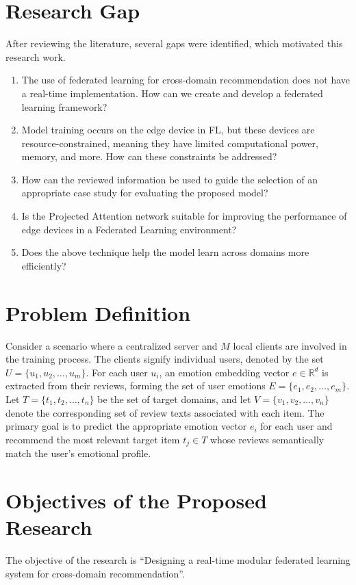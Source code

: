 \section{Research Gap}
After reviewing the literature, several gaps were identified, which motivated this research work.

\begin{enumerate}
\item The use of federated learning for cross-domain recommendation does not have a real-time implementation. How can we create and develop a federated learning framework?

\item Model training occurs on the edge device in FL, but these devices are resource-constrained, meaning they have limited computational power, memory, and more. How can these constraints be addressed?

\item How can the reviewed information be used to guide the selection of an appropriate case study for evaluating the proposed model?

\item Is the Projected Attention network suitable for improving the performance of edge devices in a Federated Learning environment?

\item Does the above technique help the model learn across domains more efficiently?
\end{enumerate}

\section{Problem Definition}
Consider a scenario where a centralized server and $M$ local clients are involved in the training process. The clients signify individual users, denoted by the set $U = \{u_1, u_2, \ldots, u_m\}$. For each user $u_i$, an emotion embedding vector $e \in \mathbb{R}^{d}$ is extracted from their reviews, forming the set of user emotions $E = \{e_1, e_2, \ldots, e_m\}$. Let $T = \{t_1, t_2, \ldots, t_n\}$ be the set of target domains, and let $V = \{v_1, v_2, \ldots, v_n\}$ denote the corresponding set of review texts associated with each item. The primary goal is to predict the appropriate emotion vector $e_i$ for each user and recommend the most relevant target item $t_j \in T$ whose reviews semantically match the user's emotional profile.

\section{Objectives of the Proposed Research}
The objective of the research is ``Designing a real-time modular federated learning system for cross-domain recommendation''.

